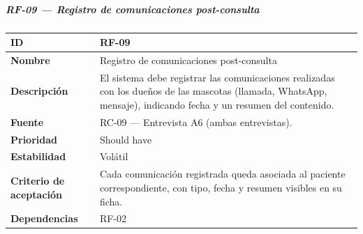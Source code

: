 \documentclass[
]{article}
\newcounter{none} %
\begin{document}
\subparagraph{RF-09 --- Registro de comunicaciones
post-consulta}\label{rf-09-registro-de-comunicaciones-post-consulta}

{\def\LTcaptype{none} %
\begin{longtable}[]{@{}
  >{\raggedright\arraybackslash}p{}
  >{\raggedright\arraybackslash}p{}@{}}
\toprule\noalign{}
\begin{minipage}[b]{\linewidth}\raggedright
\textbf{ID}
\end{minipage} & \begin{minipage}[b]{\linewidth}\raggedright
RF-09
\end{minipage} \\
\midrule\noalign{}
\endhead
\bottomrule\noalign{}
\endlastfoot
\textbf{Nombre} & \begin{minipage}[t]{\linewidth}\raggedright
Registro de comunicaciones post-consulta
\end{minipage} \\
\textbf{Descripción} & \begin{minipage}[t]{\linewidth}\raggedright
El sistema debe registrar las comunicaciones realizadas con los dueños
de las mascotas (llamada, WhatsApp, mensaje), indicando fecha y un
resumen del contenido.
\end{minipage} \\
\textbf{Fuente} & \begin{minipage}[t]{\linewidth}\raggedright
RC-09 --- Entrevista A6 (ambas entrevistas).
\end{minipage} \\
\textbf{Prioridad} & \begin{minipage}[t]{\linewidth}\raggedright
Should have
\end{minipage} \\
\textbf{Estabilidad} & \begin{minipage}[t]{\linewidth}\raggedright
Volátil
\end{minipage} \\
\textbf{Criterio de aceptación} &
\begin{minipage}[t]{\linewidth}\raggedright
Cada comunicación registrada queda asociada al paciente correspondiente,
con tipo, fecha y resumen visibles en su ficha.
\end{minipage} \\
\textbf{Dependencias} & \begin{minipage}[t]{\linewidth}\raggedright
RF-02
\end{minipage} \\
\end{longtable}
}
\end{document}
